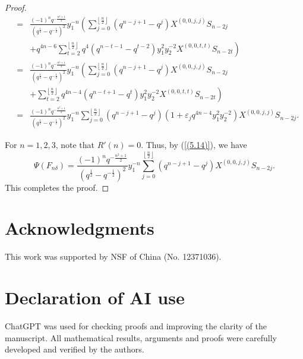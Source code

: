 \documentclass[reqno,11pt]{amsart}
\numberwithin{equation}{section}
\begin{document}
\begin{proof}
\begin{eqnarray*}
		&=&\frac{(-1)^nq^{-\frac{n^2+1}{2}}}{\left(q^{\frac12}-q^{-\frac12}\right)^2}y_1^{-n}\left(\sum\limits_{j=0}^{\left\lfloor\frac n2\right\rfloor}\left(q^{n-j+1}-q^j\right)X^{(0,0,j,j)}S_{n-2j}\right.\\
		&&\left.+q^{4n-6}\sum\limits_{t=2}^{\left\lfloor\frac n2\right\rfloor}q^4\left(q^{n-t-1}-q^{t-2}\right)y_1^2y_2^{-2}X^{(0,0,t,t)}S_{n-2t}\right)\\
		&=&\frac{(-1)^nq^{-\frac{n^2+1}{2}}}{\left(q^{\frac12}-q^{-\frac12}\right)^2}y_1^{-n}\left(\sum\limits_{j=0}^{\left\lfloor\frac n2\right\rfloor}\left(q^{n-j+1}-q^j\right)X^{(0,0,j,j)}S_{n-2j}\right.\\
		&&\left.+\sum\limits_{t=2}^{\left\lfloor\frac n2\right\rfloor}q^{4n-4}\left(q^{n-t+1}-q^t\right)y_1^2y_2^{-2}X^{(0,0,t,t)}S_{n-2t}\right)\\
		&=&\frac{(-1)^nq^{-\frac{n^2+1}{2}}}{\left(q^{\frac12}-q^{-\frac12}\right)^2}y_1^{-n}\sum\limits_{j=0}^{\left\lfloor\frac n2\right\rfloor}\left(q^{n-j+1}-q^j\right)\left(1+\varepsilon_jq^{4n-4}y_1^2y_2^{-2}\right)X^{(0,0,j,j)}S_{n-2j}.
	\end{eqnarray*}
	\endgroup
	
For $n=1,2,3$, note that $R'(n)=0$. Thus, by (\ref{(5.14)}), we have
	\[\Psi\left({{F_{n\delta}}}\right)=\frac{(-1)^nq^{-\frac{n^2+1}{2}}}{\left(q^{\frac12}-q^{-\frac12}\right)^2}y_1^{-n}\sum\limits_{j=0}^{\left\lfloor\frac n2\right\rfloor}\left(q^{n-j+1}-q^j\right)X^{(0,0,j,j)}S_{n-2j}.\]
This completes the proof.
\end{proof}


\section*{Acknowledgments}
This work was supported by NSF of China (No. 12371036).
\section*{Declaration of AI use}
 ChatGPT was used  for checking proofs and improving the clarity of the manuscript. All mathematical results, arguments and proofs were carefully developed and verified by the authors.
\end{document}
